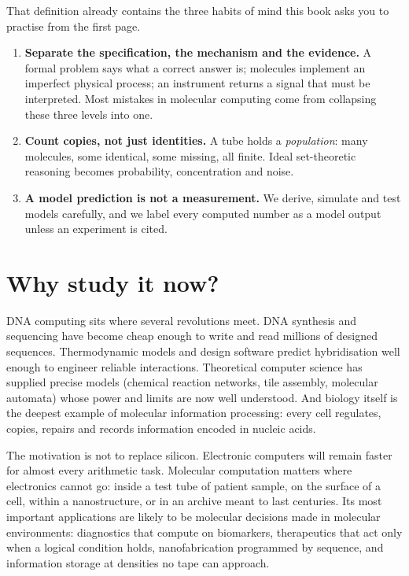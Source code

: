 That definition already contains the three habits of mind this book asks
you to practise from the first page.
\begin{enumerate}
\item \textbf{Separate the specification, the mechanism and the evidence.}
A formal problem says what a correct answer is; molecules implement an
imperfect physical process; an instrument returns a signal that must be
interpreted. Most mistakes in molecular computing come from collapsing these
three levels into one.
\item \textbf{Count copies, not just identities.} A tube holds a
\emph{population}: many molecules, some identical, some missing, all finite.
Ideal set-theoretic reasoning becomes probability, concentration and noise.
\item \textbf{A model prediction is not a measurement.} We derive, simulate
and test models carefully, and we label every computed number as a model
output unless an experiment is cited.
\end{enumerate}

\section*{Why study it now?}
DNA computing sits where several revolutions meet. DNA synthesis and
sequencing have become cheap enough to write and read millions of designed
sequences. Thermodynamic models and design software predict hybridisation well
enough to engineer reliable interactions. Theoretical computer science has
supplied precise models (chemical reaction networks, tile assembly, molecular
automata) whose power and limits are now well understood. And biology itself
is the deepest example of molecular information processing: every cell
regulates, copies, repairs and records information encoded in nucleic acids.

The motivation is not to replace silicon. Electronic computers will remain
faster for almost every arithmetic task. Molecular computation matters where
electronics cannot go: inside a test tube of patient sample, on the surface of
a cell, within a nanostructure, or in an archive meant to last centuries. Its
most important applications are likely to be molecular decisions made in
molecular environments: diagnostics that compute on biomarkers, therapeutics
that act only when a logical condition holds, nanofabrication programmed by
sequence, and information storage at densities no tape can approach.

